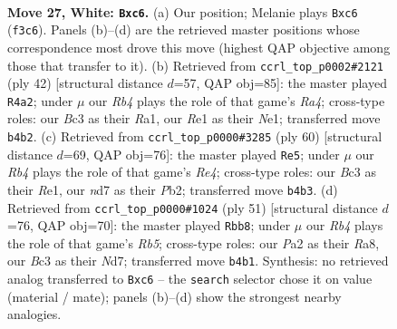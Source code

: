 \documentclass[11pt]{article}
\begin{document}
\clearpage

\begin{figure}[p]\centering
\begin{subfigure}{0.46\textwidth}\centering
\resizebox{\linewidth}{!}{%
\newchessgame
\chessboard[
  setfen={1rb2r2/p2n1p1k/1pn1p1pp/8/1RP5/N1B1PB1P/P4PP1/4RK2 w - - 0 27},
  showmover=false,
  pgfstyle=straightmove, color=movearrow, markmove={f3-c6}
]}
\caption{}
\end{subfigure}\hfill
\begin{subfigure}{0.46\textwidth}\centering
\resizebox{\linewidth}{!}{%
\newchessgame
\chessboard[
  setfen={r2r2k1/1pn2ppp/pnp1p3/8/R2P4/1PB3P1/1P2PPKP/R3N3 w - - 3 22},
  showmover=false,
  pgfstyle=straightmove, color=movearrow, markmove={a4-a2}
]}
\caption{}
\end{subfigure}
\\[4pt]
\begin{subfigure}{0.46\textwidth}\centering
\resizebox{\linewidth}{!}{%
\newchessgame
\chessboard[
  setfen={2r1r3/1p3kpp/p1pnp3/B2n4/2BPR3/1P4P1/1P3PKP/4R3 w - - 11 31},
  showmover=false,
  pgfstyle=straightmove, color=movearrow, markmove={e4-e5}
]}
\caption{}
\end{subfigure}\hfill
\begin{subfigure}{0.46\textwidth}\centering
\resizebox{\linewidth}{!}{%
\newchessgame
\chessboard[
  setfen={r7/3nbpkp/2b1p1p1/p2p4/1r1P4/2NNP1P1/1P2BP1P/RR4K1 b - - 3 26},
  showmover=false,
  pgfstyle=straightmove, color=movearrow, markmove={b4-b8}
]}
\caption{}
\end{subfigure}
\caption{\textbf{Move 27, White: \texttt{Bxc6}.} (a) Our position; Melanie plays \texttt{Bxc6} (\texttt{f3c6}). Panels (b)--(d) are the retrieved master positions whose correspondence most drove this move (highest QAP objective among those that transfer to it). (b) Retrieved from \texttt{ccrl\_top\_p0002\#2121} (ply 42) [structural distance $d$=57, QAP obj=85]: the master played \texttt{R4a2}; under $\mu$ our \emph{Rb4} plays the role of that game's \emph{Ra4}; cross-type roles: our \emph{B}c3 as their \emph{R}a1, our \emph{R}e1 as their \emph{N}e1; transferred move \texttt{b4b2}. (c) Retrieved from \texttt{ccrl\_top\_p0000\#3285} (ply 60) [structural distance $d$=69, QAP obj=76]: the master played \texttt{Re5}; under $\mu$ our \emph{Rb4} plays the role of that game's \emph{Re4}; cross-type roles: our \emph{B}c3 as their \emph{R}e1, our \emph{n}d7 as their \emph{P}b2; transferred move \texttt{b4b3}. (d) Retrieved from \texttt{ccrl\_top\_p0000\#1024} (ply 51) [structural distance $d$=76, QAP obj=70]: the master played \texttt{Rbb8}; under $\mu$ our \emph{Rb4} plays the role of that game's \emph{Rb5}; cross-type roles: our \emph{P}a2 as their \emph{R}a8, our \emph{B}c3 as their \emph{N}d7; transferred move \texttt{b4b1}. Synthesis: no retrieved analog transferred to \texttt{Bxc6} -- the \texttt{search} selector chose it on value (material / mate); panels (b)--(d) show the strongest nearby analogies.}
\label{fig:thought-m52}
\end{figure}
\end{document}
